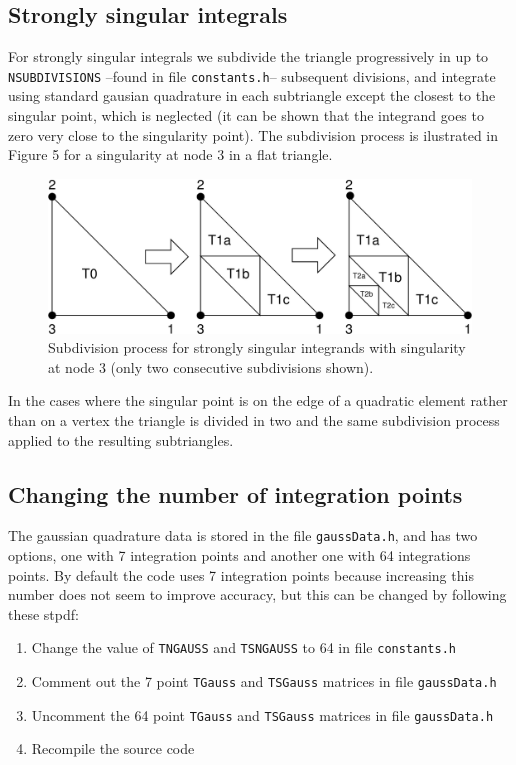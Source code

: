 \documentclass[12pt]{article}
\begin{document}
\subsection*{Strongly singular integrals}
For strongly singular integrals we subdivide the triangle progressively in up to \verb+NSUBDIVISIONS+ --found in file \verb+constants.h+-- subsequent divisions, and integrate using standard gausian quadrature in each subtriangle except the closest to the singular point, which is neglected (it can be shown that the integrand goes to zero very close to the singularity point). The subdivision process is ilustrated in Figure 5 for a singularity at node 3 in a flat triangle.

\begin{figure}[!hbt]
\begin{center}
\includegraphics[width=\textwidth]{strongly_singular.pdf}
\caption{Subdivision process for strongly singular integrands with singularity at node 3 (only two consecutive subdivisions shown).}
\end{center}
\end{figure}

In the cases where the singular point is on the edge of a quadratic element rather than on a vertex the triangle is divided in two and the same subdivision process applied to the resulting subtriangles.

\subsection*{Changing the number of integration points}
The gaussian quadrature data is stored in the file \verb+gaussData.h+, and has two options, one with 7 integration points and another one with 64 integrations points. By default the code uses 7 integration points because increasing this number does not seem to improve accuracy, but this can be changed by following these stpdf:

\begin{enumerate}
\item Change the value of \verb+TNGAUSS+ and \verb+TSNGAUSS+ to 64 in file \verb+constants.h+
\item Comment out the 7 point \verb+TGauss+ and \verb+TSGauss+ matrices in file \verb+gaussData.h+
\item Uncomment the 64 point \verb+TGauss+ and \verb+TSGauss+ matrices in file \verb+gaussData.h+
\item Recompile the source code
\end{enumerate}
\end{document}
